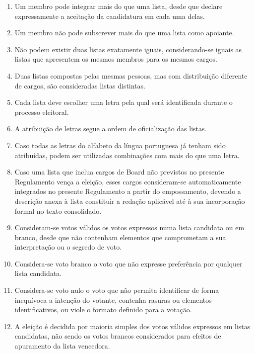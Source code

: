 \begin{enumerate}
\begin{enumerate}
    \item Incluir declaração de aceitação assinada por todos os membros candidatos aos cargos nela indicados.
    \item Caso inclua cargos de Board não previstos no presente Regulamento, apresentar em anexo uma descrição clara das respetivas responsabilidades, âmbito de atuação e enquadramento na estrutura da equipa.
  \end{enumerate}
  \item Um membro pode integrar mais do que uma lista, desde que declare expressamente a aceitação da candidatura em cada uma delas.
  \item Um membro não pode subscrever mais do que uma lista como apoiante.
  \item Não podem existir duas listas exatamente iguais, considerando-se iguais as listas que apresentem os mesmos membros para os mesmos cargos.
  \item Duas listas compostas pelas mesmas pessoas, mas com distribuição diferente de cargos, são consideradas listas distintas.
  \item Cada lista deve escolher uma letra pela qual será identificada durante o processo eleitoral.
  \item A atribuição de letras segue a ordem de oficialização das listas.
  \item Caso todas as letras do alfabeto da língua portuguesa já tenham sido atribuídas, podem ser utilizadas combinações com mais do que uma letra.
  \item Caso uma lista que inclua cargos de Board não previstos no presente Regulamento vença a eleição, esses cargos consideram-se automaticamente integrados no presente Regulamento a partir do empossamento, devendo a descrição anexa à lista constituir a redação aplicável até à sua incorporação formal no texto consolidado.
  \item Consideram-se votos válidos os votos expressos numa lista candidata ou em branco, desde que não contenham elementos que comprometam a sua interpretação ou o segredo de voto.
  \item Considera-se voto branco o voto que não expresse preferência por qualquer lista candidata.
  \item Considera-se voto nulo o voto que não permita identificar de forma inequívoca a intenção do votante, contenha rasuras ou elementos identificativos, ou viole o formato definido para a votação.
  \item A eleição é decidida por maioria simples dos votos válidos expressos em listas candidatas, não sendo os votos brancos considerados para efeitos de apuramento da lista vencedora.

\end{enumerate}
